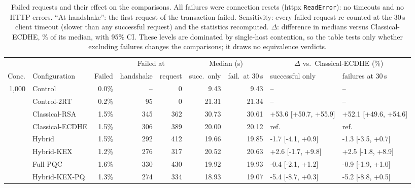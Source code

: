 \begin{table}[t]
\centering
\caption{Failed requests and their effect on the comparisons. All failures were connection resets (httpx \texttt{ReadError}): no timeouts and no HTTP errors. ``At handshake'': the first request of the transaction failed. Sensitivity: every failed request re-counted at the 30\,s client timeout (slower than any successful request) and the statistics recomputed. $\Delta$: difference in medians versus Classical-ECDHE, \% of its median, with 95\% CI. These levels are dominated by single-host contention, so the table tests only whether excluding failures changes the comparisons; it draws no equivalence verdicts.}
\label{tab:failures}
\setlength{\tabcolsep}{3pt}
\footnotesize
\begin{tabular}{@{}rlrrrrrll@{}}
\toprule
 & & & \multicolumn{2}{c}{Failed at} & \multicolumn{2}{c}{Median (s)} & \multicolumn{2}{c}{$\Delta$ vs.\ Classical-ECDHE (\%)} \\
\cmidrule(lr){4-5}\cmidrule(lr){6-7}\cmidrule(lr){8-9}
Conc. & Configuration & Failed & handshake & request & succ.\ only & fail.\ at 30\,s & successful only & failures at 30\,s \\
\midrule
1,000 & Control & 0.0\% & -- & 0 & 9.43 & 9.43 & -- & -- \\
 & Control-2RT & 0.2\% & 95 & 0 & 21.31 & 21.34 & -- & -- \\
 & Classical-RSA & 1.5\% & 345 & 362 & 30.73 & 30.61 & +53.6 [+50.7, +55.9] & +52.1 [+49.6, +54.6] \\
 & Classical-ECDHE & 1.5\% & 306 & 389 & 20.00 & 20.12 & ref. & ref. \\
 & Hybrid & 1.5\% & 292 & 412 & 19.66 & 19.85 & -1.7 [-4.1, +0.9] & -1.3 [-3.5, +0.7] \\
 & Hybrid-KEX & 1.2\% & 276 & 317 & 20.52 & 20.63 & +2.6 [-1.7, +9.8] & +2.5 [-1.8, +8.9] \\
 & Full PQC & 1.6\% & 330 & 430 & 19.92 & 19.93 & -0.4 [-2.1, +1.2] & -0.9 [-1.9, +1.0] \\
 & Hybrid-KEX-PQ & 1.3\% & 274 & 334 & 18.93 & 19.07 & -5.4 [-8.7, +0.3] & -5.2 [-8.8, +0.5] \\
\bottomrule
\end{tabular}
\end{table}
